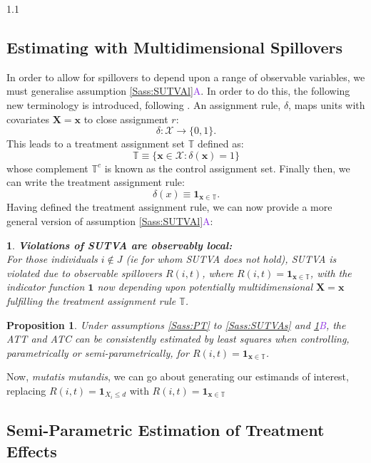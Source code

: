 \documentclass{article}
\makeatletter
\newtheorem{proposition}{Proposition}
\newtheorem*{assumption*}{\assumptionnumber}
\providecommand{\assumptionnumber}{}
\newenvironment{assumption}[2]
 {%
  \renewcommand{\assumptionnumber}{Assumption #1{#2}}%
  \begin{assumption*}%
  \protected@edef\@currentlabel{#1}%
 }
 {%
  \end{assumption*}
 }
\newcommand{\asref}[2]{\ref{#1}{\textcolor{BlueViolet}{#2}}}
\makeatother
\begin{document}
\begin{spacing}{1.1}
\subsection{Estimating with Multidimensional Spillovers}
In order to allow for spillovers to depend upon a range of observable variables,
we must generalise assumption \asref{Sass:SUTVAl}{A}.  In order to do this, the
following new terminology is introduced, following \citet{Zajonc2012}. An 
assignment rule, $\delta$, maps units with covariates $\mathbf{X=x}$ to close
assignment $r$:
\[
\delta: \mathcal{X} \rightarrow \{0,1\}.
\]
This leads to a treatment assignment set $\mathbb{T}$ defined as:
\[
\mathbb{T}\equiv \{ \mathbf{x}\in\mathcal{X}: \delta(\mathbf{x})=1 \}
\]
whose complement $\mathbb{T}^c$ is known as the control assignment
set. Finally then, we can write the treatment assignment rule:
\begin{equation}
\delta(x)\equiv \mathbf{1}_{\mathbf{x}\in\mathbb{T}}.
\end{equation}
Having defined the treatment assignment rule, we can now provide a
more general version of assumption \asref{Sass:SUTVAl}{A}:

\begin{assumption}{4}{B}
\label{Sass:SUTVAlM}
\textbf{Violations of SUTVA are observably local:} \\ 
For those individuals $i\notin J$ (ie for whom SUTVA does not hold), SUTVA is
violated due to observable spillovers $R(i,t)$, where 
$R(i,t)=\mathbf{1}_{\mathbf{x}\in \mathbb{T}}$, with the indicator function 
$\mathbf{1}$ now depending upon potentially multidimensional
$\mathbf{X=x}$
fulfilling the treatment assignment rule $\mathbb{T}$.
\end{assumption}

\begin{proposition}
\label{Pass:ATTnonP}
Under assumptions \ref{Sass:PT} to \ref{Sass:SUTVAs} and
\asref{Sass:SUTVAlM}{B}, the ATT and ATC can be consistently estimated
by least squares when controlling, parametrically or
semi-parametrically, for $R(i,t)=\mathbf{1}_{\mathbf{x}\in
  \mathbb{T}}$. 
\end{proposition}

Now, \emph{mutatis mutandis}, we can go about generating our estimands of
interest, replacing $R(i,t)=\mathbf{1}_{X_i\leq d}$ with
$R(i,t)=\mathbf{1}_{\mathbf{x}\in \mathbb{T}}$


\subsection{Semi-Parametric Estimation of Treatment Effects}



\end{spacing}
\end{document}
